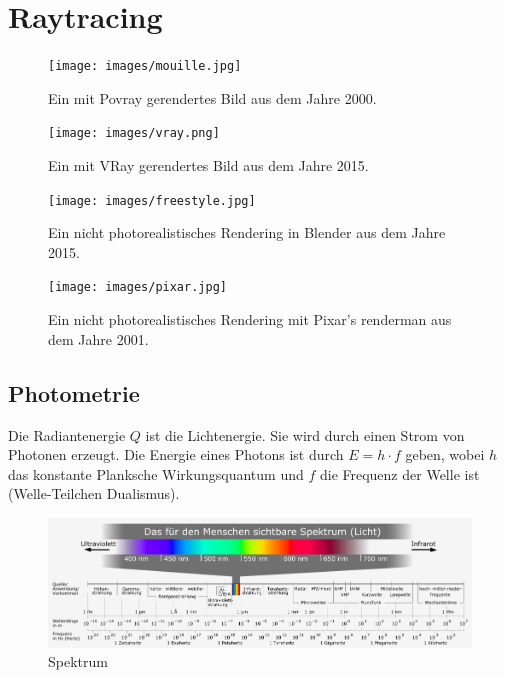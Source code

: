 \section{Raytracing}
 
\begin{figure}[H]
    \centering
    \texttt{[image: images/mouille.jpg]}
    \caption{Ein mit Povray gerendertes Bild aus dem Jahre 2000.}
    \label{fig:povray}
\end{figure}


 \begin{figure}[H]
    \centering
    \texttt{[image: images/vray.png]}
    \caption{Ein mit VRay gerendertes Bild aus dem Jahre 2015.}
    \label{fig:cray}
\end{figure}


 \begin{figure}[H]
    \centering
    \texttt{[image: images/freestyle.jpg]}
    \caption{Ein nicht photorealistisches Rendering in Blender aus dem Jahre 2015.}
    \label{fig:cray}
\end{figure}


 \begin{figure}[H]
    \centering
    \texttt{[image: images/pixar.jpg]}
    \caption{Ein nicht photorealistisches Rendering mit Pixar's renderman aus dem Jahre 2001.}
    \label{fig:cray}
\end{figure}


\subsection{Photometrie}

Die Radiantenergie $Q$ ist die Lichtenergie. Sie wird durch einen Strom von Photonen erzeugt. Die Energie eines Photons ist 
durch $E=h \cdot f$ geben, wobei $h$ das konstante Planksche Wirkungsquantum und $f$ die Frequenz der Welle ist (Welle-Teilchen Dualismus).  

 \begin{figure}[H]
    \centering
    \includegraphics[width=1.0\textwidth]{images/Electromagnetic_spectrum_c.png}
    \caption{Spektrum}
    \label{fig:cray}
\end{figure}


